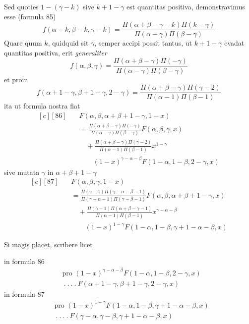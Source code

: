 \par{}
Sed quoties $1-(\gamma-k)$ sive $k+1-\gamma$ est quantitas positiva, demonstravimus
esse (formula 85)
\[
f(\alpha-k,\beta-k,\gamma-k)
=\frac{\Pi(\alpha+\beta-\gamma-k)\Pi(k-\gamma)}{\Pi(\alpha-\gamma)\Pi(\beta-\gamma)}
\]
Quare quum $k$, quidquid sit $\gamma$, semper accipi possit tantus, ut $k+1-\gamma$ evadat
quantitas positiva, erit \textit{generaliter}
\[
f(\alpha,\beta,\gamma)
=\frac{\Pi(\alpha+\beta-\gamma)\Pi(-\gamma)}{\Pi(\alpha-\gamma)\Pi(\beta-\gamma)}
\]
et proin
\[
f(\alpha+1-\gamma,\beta+1-\gamma,2-\gamma)
=\frac{\Pi(\alpha+\beta-\gamma)\Pi(\gamma-2)}{\Pi(\alpha-1)\Pi(\beta-1)}
\]
ita ut formula nostra fiat
\[
\begin{aligned}[c]
[86]\quad &F(\alpha,\beta,\alpha+\beta+1-\gamma,1-x)\\
&=\frac{\Pi(\alpha+\beta-\gamma)\Pi(-\gamma)}{\Pi(\alpha-\gamma)\Pi(\beta-\gamma)}F(\alpha,\beta,\gamma,x)\\
&\quad+\frac{\Pi(\alpha+\beta-\gamma)\Pi(\gamma-2)}{\Pi(\alpha-1)\Pi(\beta-1)}x^{1-\gamma}\\&\qquad(1-x)^{\gamma-\alpha-\beta}F(1-\alpha,1-\beta,2-\gamma,x)
\end{aligned}
\]
sive mutata $\gamma$ in $\alpha+\beta+1-\gamma$
\[
\begin{aligned}[c]
[87]\quad &F(\alpha,\beta,\gamma,1-x)\\
&=\frac{\Pi(\gamma-1)\Pi(\gamma-\alpha-\beta-1)}{\Pi(\gamma-\alpha-1)\Pi(\gamma-\beta-1)}F(\alpha,\beta,\alpha+\beta+1-\gamma,x)\\
&\quad+\frac{\Pi(\gamma-1)\Pi(\alpha+\beta-\gamma-1)}{\Pi(\alpha-1)\Pi(\beta-1)}x^{\gamma-\alpha-\beta}\\&\qquad(1-x)^{1-\gamma}F(1-\alpha,1-\beta,\gamma+1-\alpha-\beta,x)
\end{aligned}
\]

Si magis placet, scribere licet

in formula 86
\[
\begin{aligned}&\text{pro }(1-x)^{\gamma-\alpha-\beta}F(1-\alpha,1-\beta,2-\gamma,x)\\&\ .\ .\ .\ .\ F(\alpha+1-\gamma,\beta+1-\gamma,2-\gamma,x)\end{aligned}
\]
in formula 87
\[
\begin{aligned}&\text{pro }(1-x)^{1-\gamma}F(1-\alpha,1-\beta,\gamma+1-\alpha-\beta,x)\\&\ .\ .\ .\ .\ F(\gamma-\alpha,\gamma-\beta,\gamma+1-\alpha-\beta,x)\end{aligned}
\]

